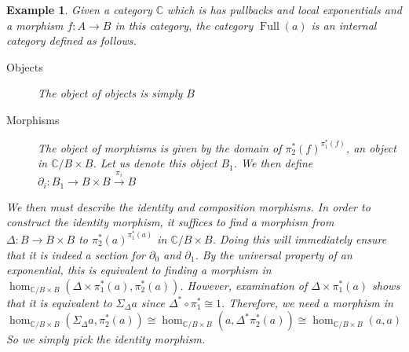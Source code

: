 \documentclass[12pt]{amsart}
\newcommand{\Ccat}{\ensuremath{\mathbb{C}}}
\DeclareMathOperator{\full}{Full}
\newtheorem{example}[thm]{Example}
\begin{document}
\begin{example}\label{ex:internal:full}
  Given a category $\Ccat$ which is has pullbacks and local
  exponentials and a morphism $f : A \to B$ in this category, the
  category $\full(a)$ is an internal category defined as follows.
  \begin{description}
  \item[Objects] The object of objects is simply $B$
  \item[Morphisms] The object of morphisms is given by the domain of
    $\pi_2^*(f)^{\pi_1^*(f)}$, an object in $\Ccat/B \times B$. Let us
    denote this object $B_1$. We then define
    $\partial_i : B_1 \to B \times B \overset{\pi_i}{\to} B$
  \end{description}
  We then must describe the identity and composition morphisms. In
  order to construct the identity morphism, it suffices to find a
  morphism from $\Delta : B \to B \times B$ to
  $\pi_2^*(a)^{\pi_1^*(a)}$ in $\Ccat/B \times B$. Doing this will
  immediately ensure that it is indeed a section for $\partial_0$ and
  $\partial_1$. By the universal property of an exponential, this is
  equivalent to finding a morphism in
  $\hom_{\Ccat/B \times B}(\Delta \times \pi_1^*(a), \pi_2^*(a))$.
  However, examination of $\Delta \times \pi_1^*(a)$ shows that it is
  equivalent to $\Sigma_\Delta a$ since
  $\Delta^* \circ \pi_1^* \cong 1$. Therefore, we need a morphism in
  \[
    \hom_{\Ccat/B \times B}(\Sigma_\Delta a, \pi_2^*(a)) \cong
    \hom_{\Ccat/B \times B}(a, \Delta^* \pi_2^*(a)) \cong
    \hom_{\Ccat/B \times B}(a, a)
  \]
  So we simply pick the identity morphism.


\end{example}
\end{document}
